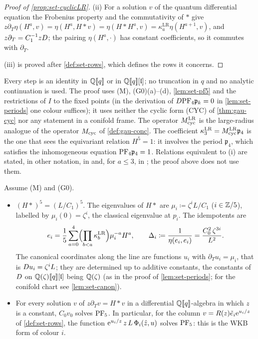 \begin{proof}[Proof of \cref{prop:set-cyclicLR}]
(ii) For a solution $v$ of the quantum differential equation the Frobenius property and the commutativity of $*$ give $z\partial_T\eta(H^a,v)=\eta(H^a,H*v)=\eta(H*H^a,v)=\kappa^{\mathrm{LR}}_a\eta(H^{a+1},v)$, and $z\partial_T=C_1^{-1}zD$; the pairing $\eta(H^a,\cdot)$ has constant coefficients, so it commutes with $\partial_T$.

(iii) is proved after \cref{def:set-rows}, which defines the rows it concerns.
\end{proof}

Every step is an identity in $\mathbb{Q}[\![ q ]\!]$ or in $\mathbb{Q}[\![ q ]\!][\mathfrak{l}]$; no truncation in $q$ and no analytic continuation is used. The proof uses (M), (G0)(a)--(d), \cref{lem:set-pf5} and the restrictions of $I$ to the fixed points (in the derivation of $D\mathrm{PF}_{4}\mathfrak p_k=0$ in \cref{lem:set-periods} one colour suffices); it uses neither the cyclic form (CYC) of \cref{thm:gau-cyc} nor any statement in a conifold frame. The operator $M_{\mathrm{cyc}}^{\mathrm{LR}}$ is the large-radius analogue of the operator $M_{\mathrm{cyc}}$ of \cref{def:gau-conc}. The coefficient $\kappa^{\mathrm{LR}}_3=M_{\mathrm{cyc}}^{\mathrm{LR}}\mathfrak p_4$ is the one that sees the equivariant relation $H^5=1$: it involves the period $\mathfrak p_4$, which satisfies the inhomogeneous equation $\mathrm{PF}_{4}\mathfrak p_4=1$. Relations equivalent to (i) are stated, in other notation, in \cite[Props.~6.1--6.2]{GR19} and, for $a\leq3$, in \cite[Section~2.4.3, (17), and Section~2.4.4, (19)--(20)]{LP20}; the proof above does not use them.

\begin{cor}
\label{cor:set-cyclicPF5}
Assume (M) and (G0).
\begin{itemize}
\item[(a)] $(H*)^5=(L/C_1)^5$. The eigenvalues of $H*$ are $\mu_i\coloneqq\zeta^iL/C_1$ ($i\in\mathbb{Z}/5$), labelled by $\mu_i(0)=\zeta^i$, the classical eigenvalue at $p_i$. The idempotents are
\[
e_i=\frac15\sum_{a=0}^4\Bigl(\prod_{b<a}\kappa^{\mathrm{LR}}_b\Bigr)\mu_i^{-a}H^a,\qquad\Delta_i\coloneqq\frac1{\eta(e_i,e_i)}=\frac{C_0^2\,\zeta^{3i}}{L^2}.
\]
The canonical coordinates along the line are functions $u_i$ with $\partial_Tu_i=\mu_i$, that is $D u_i=\zeta^iL$; they are determined up to additive constants, the constants of $D$ on $\mathbb{Q}(\zeta)[\![ q ]\!][\mathfrak{l}]$ being $\mathbb{Q}(\zeta)$ (as in the proof of \cref{lem:set-periods}; for the conifold chart see \cref{lem:set-canon}).
\item[(b)] For every solution $v$ of $z\partial_Tv=H*v$ in a differential $\mathbb{Q}[\![ q ]\!]$-algebra in which $z$ is a constant, $C_0v_0$ solves $\mathrm{PF}_{5}$. In particular, for the column $v=R(z)\tilde e_i\mathrm{e}^{u_i/z}$ of \cref{def:set-rows}, the function $\mathrm{e}^{u_i/z}\,z\,L\,\Phi_i(\hat{z},u)$ solves $\mathrm{PF}_{5}$: this is the WKB form of colour $i$.
\end{itemize}
\end{cor}

